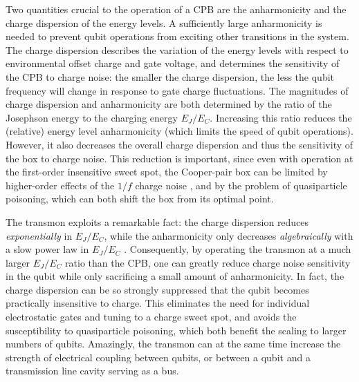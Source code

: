 \documentclass[twocolumn,amsmath,amssymb,floatfix,pra,showpacs,eqsecnum,footinbib,superscriptaddress]{revtex4}
\begin{document}
Two quantities crucial to the operation of a CPB are the anharmonicity and the charge dispersion of the energy levels.  A sufficiently large anharmonicity is needed to prevent qubit operations from exciting other transitions in the system.  The charge dispersion describes the variation of the energy levels with respect to environmental offset charge and gate voltage, and determines the sensitivity of the CPB to charge noise:  the smaller the charge dispersion, the less the qubit frequency will change in response to gate charge fluctuations. The magnitudes of charge dispersion and anharmonicity are both determined by the ratio of the Josephson energy to the charging energy $E_J/E_C$. Increasing this ratio reduces the (relative) energy level anharmonicity (which limits the speed of qubit operations).  However, it also decreases the overall charge dispersion and thus the sensitivity of the box to charge noise. This reduction is important, since even with operation at the first-order insensitive sweet spot, the Cooper-pair box can be limited by higher-order effects of the $1/f$ charge noise \cite{ithier}, and by the problem of quasiparticle poisoning, which can both shift the box from its optimal point.

The transmon exploits a remarkable fact:  the charge dispersion reduces \emph{exponentially} in $E_J/E_C$, while the anharmonicity only decreases \emph{algebraically} with a slow power law in $E_J/E_C$ \cite{cottet}.  Consequently, by operating the transmon at a much larger $E_J/E_C$ ratio than the CPB, one can greatly reduce charge noise sensitivity in the qubit while only sacrificing a small amount of anharmonicity. In fact, the charge dispersion can be so strongly suppressed that the qubit becomes practically insensitive to charge. This eliminates the need for individual electrostatic gates and tuning to a charge sweet spot, and avoids the susceptibility to quasiparticle poisoning, which both benefit the scaling to larger numbers of qubits. Amazingly, the transmon can at the same time increase the strength of electrical coupling between qubits, or between a qubit and a transmission line cavity serving as a bus.
\end{document}
